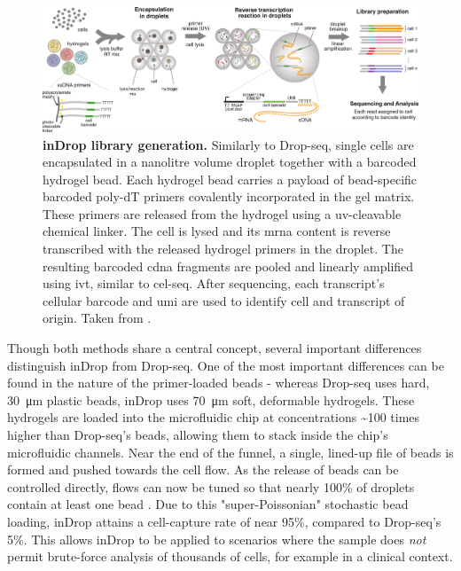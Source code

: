 \begin{figure}[ht]
	\centerfloat
	\includegraphics[width=\textwidth]{./ims/klein2015_3.png}
	\caption[inDrop library generation]{\textbf{inDrop library generation.} Similarly to Drop-seq, single cells are encapsulated in a nanolitre volume droplet together with a barcoded hydrogel bead. Each hydrogel bead carries a payload of bead-specific barcoded poly-dT primers covalently incorporated in the gel matrix. These primers are released from the hydrogel using a \acrshort{uv}-cleavable chemical linker. The cell is lysed and its \acrshort{mrna} content is reverse transcribed with the released hydrogel primers in the droplet. The resulting barcoded \acrshort{cdna} fragments are pooled and linearly amplified using \acrshort{ivt}, similar to \acrshort{cel-seq}. After sequencing, each transcript's cellular barcode and \acrshort{umi} are used to identify cell and transcript of origin. Taken from \cite{klein2015}.}
	\label{fig:klein2015_3}
\end{figure}

Though both methods share a central concept, several important differences distinguish inDrop from Drop-seq. One of the most important differences can be found in the nature of the primer-loaded beads - whereas Drop-seq uses hard, \SI{30}{\micro\metre} plastic beads, inDrop uses \SI{70}{\micro\metre} soft, deformable hydrogels. These hydrogels are loaded into the microfluidic chip at concentrations \textasciitilde{}100 times higher than Drop-seq's beads, allowing them to stack inside the chip's microfluidic channels. Near the end of the funnel, a single, lined-up file of beads is formed and pushed towards the cell flow. As the release of beads can be controlled directly, flows can now be tuned so that nearly 100\% of droplets contain at least one bead \citep{klein2015, abate2009}. Due to this "super-Poissonian" stochastic bead loading, inDrop attains a cell-capture rate of near 95\%, compared to Drop-seq's 5\%. This allows inDrop to be applied to scenarios where the sample does \textit{not} permit brute-force analysis of thousands of cells, for example in a clinical context.\pms

